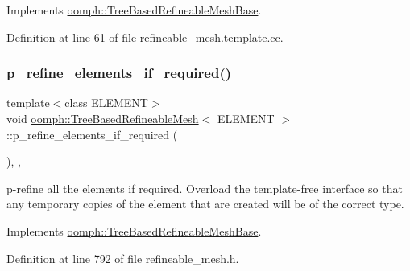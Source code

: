 Implements \hyperlink{classoomph_1_1TreeBasedRefineableMeshBase_a59d0404f8e5ebd7199f25c794c5c715c}{oomph\+::\+Tree\+Based\+Refineable\+Mesh\+Base}.



Definition at line 61 of file refineable\+\_\+mesh.\+template.\+cc.

\mbox{\label{classoomph_1_1TreeBasedRefineableMesh_aa47363e7700089d4b8756b2339c4893c}} 
\subsubsection{\texorpdfstring{p\+\_\+refine\+\_\+elements\+\_\+if\+\_\+required()}{p\_refine\_elements\_if\_required()}}
{\footnotesize\ttfamily template$<$class E\+L\+E\+M\+E\+NT$>$ \\
void \hyperlink{classoomph_1_1TreeBasedRefineableMesh}{oomph\+::\+Tree\+Based\+Refineable\+Mesh}$<$ E\+L\+E\+M\+E\+NT $>$\+::p\+\_\+refine\+\_\+elements\+\_\+if\+\_\+required (\begin{DoxyParamCaption}{ }\end{DoxyParamCaption})\hspace{0.3cm}{\ttfamily [inline]}, {\ttfamily [private]}, {\ttfamily [virtual]}}



p-\/refine all the elements if required. Overload the template-\/free interface so that any temporary copies of the element that are created will be of the correct type. 



Implements \hyperlink{classoomph_1_1TreeBasedRefineableMeshBase_a9a2f26f447d6386505bdbdd0ac518321}{oomph\+::\+Tree\+Based\+Refineable\+Mesh\+Base}.



Definition at line 792 of file refineable\+\_\+mesh.\+h.

\mbox{\label{classoomph_1_1TreeBasedRefineableMesh_a43f134cb974f25f25d5ddfa88d56ef95}} 
